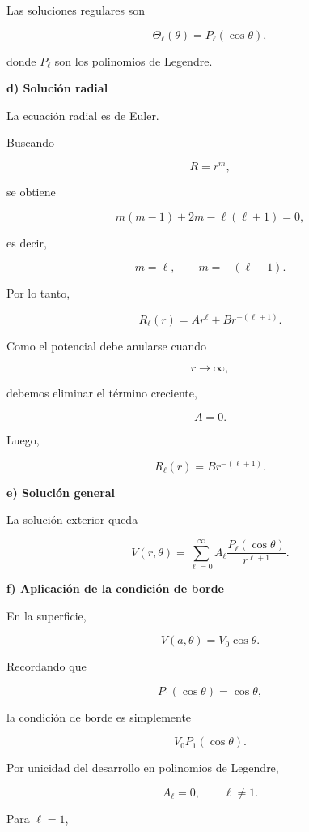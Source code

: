 \documentclass[11pt,spanish]{article}
\begin{document}
Las soluciones regulares son

\[
\boxed{
\Theta_\ell(\theta)=P_\ell(\cos\theta),
}
\]

donde \(P_\ell\) son los polinomios de Legendre.


{\bf d) Solución radial}

La ecuación radial es de Euler.

Buscando

\[
R=r^m,
\]

se obtiene

\[
m(m-1)+2m-\ell(\ell+1)=0,
\]

es decir,

\[
m=\ell,
\qquad
m=-(\ell+1).
\]

Por lo tanto,

\[
R_\ell(r)
=
Ar^\ell
+
Br^{-(\ell+1)}.
\]

Como el potencial debe anularse cuando

\[
r\rightarrow\infty,
\]

debemos eliminar el término creciente,

\[
A=0.
\]

Luego,

\[
\boxed{
R_\ell(r)=Br^{-(\ell+1)}.
}
\]


{\bf e) Solución general}

La solución exterior queda

\[
V(r,\theta)
=
\sum_{\ell=0}^{\infty}
A_\ell
\frac{
P_\ell(\cos\theta)
}{
r^{\ell+1}
}.
\]


{\bf f) Aplicación de la condición de borde}

En la superficie,

\[
V(a,\theta)=V_0\cos\theta.
\]

Recordando que

\[
P_1(\cos\theta)=\cos\theta,
\]

la condición de borde es simplemente

\[
V_0P_1(\cos\theta).
\]

Por unicidad del desarrollo en polinomios de Legendre,

\[
A_\ell=0,
\qquad
\ell\neq1.
\]

Para \(\ell=1\),
\end{document}
